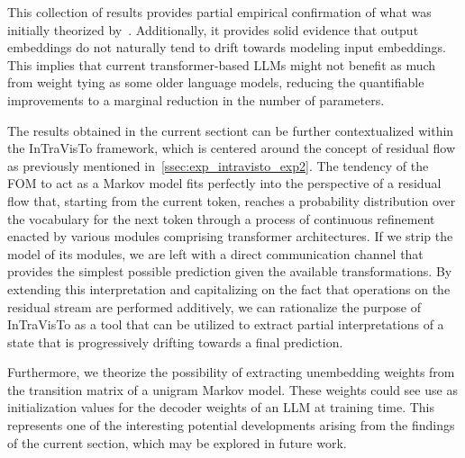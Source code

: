 This collection of results provides partial empirical confirmation of what was initially theorized by~\citet{elhage2021}.
Additionally, it provides solid evidence that output embeddings do not naturally tend to drift towards modeling input embeddings.
This implies that current transformer-based LLMs might not benefit as much from weight tying as some older language models, reducing the quantifiable improvements to a marginal reduction in the number of parameters.

The results obtained in the current sectiont can be further contextualized within the InTraVisTo framework, which is centered around the concept of residual flow as previously mentioned in~\cref{ssec:exp_intravisto_exp2}.
The tendency of the FOM to act as a Markov model fits perfectly into the perspective of a residual flow that, starting from the current token, reaches a probability distribution over the vocabulary for the next token through a process of continuous refinement enacted by various modules comprising transformer architectures.
If we strip the model of its modules, we are left with a direct communication channel that provides the simplest possible prediction given the available transformations.
By extending this interpretation and capitalizing on the fact that operations on the residual stream are performed additively, we can rationalize the purpose of InTraVisTo as a tool that can be utilized to extract partial interpretations of a state that is progressively drifting towards a final prediction.

Furthermore, we theorize the possibility of extracting unembedding weights from the transition matrix of a unigram Markov model.
These weights could see use as initialization values for the decoder weights of an LLM at training time.
This represents one of the interesting potential developments arising from the findings of the current section, which may be explored in future work.
